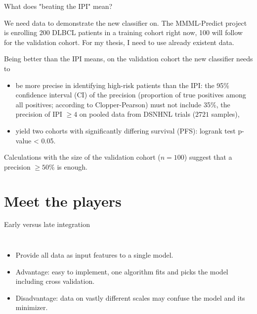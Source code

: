\documentclass[10pt, aspectratio=169]{beamer}
\begin{document}
\begin{frame}{What does "beating the IPI" mean?}

  We need \alert{data} to demonstrate the new classifier on. The MMML-Predict project is enrolling 200 DLBCL 
  patients in a training cohort right now, 100 will follow for the validation cohort. For my thesis,
  I need to use already existent data.

  Being better than the IPI means, on the validation cohort the new classifier needs to 

  \begin{itemize}
    \item be \alert{more precise in identifying high-risk patients} than the IPI: the 95\% confidence interval (CI) 
    of the precision (proportion of true positives among all positives; according to Clopper-Pearson) must 
    not include 35\%, the precision of IPI $\geq 4$ on pooled data from DSNHNL trials ($\num{2721}$ samples),
    \item yield \alert{two cohorts with significantly differing survival} (PFS): logrank test p-value < 0.05.
  \end{itemize}

  Calculations with the size of the validation cohort ($n = 100$) suggest that a precision $\geq 50\%$ is enough.
\end{frame}

\section{Meet the players}

\begin{frame}{\alert{Early} versus late integration}
  \begin{columns}
      \centering
      \begin{itemize}
        \item Provide all data as input features to a single model.
        \item Advantage: easy to implement, one algorithm fits and picks the model 
          including cross validation.
        \item Disadvantage: data on vastly different scales may confuse the model and 
          its minimizer.
      \end{itemize}
  \end{columns}
\end{frame}
\end{document}
